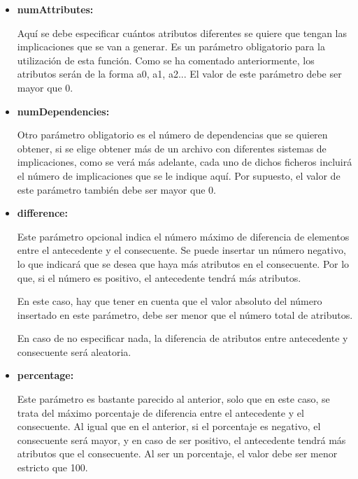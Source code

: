    \begin{itemize}
        \item \textbf{numAttributes:}

        Aqu\'i se debe especificar cu\'antos atributos diferentes se quiere que tengan las implicaciones que se van a generar. Es un 
        par\'ametro obligatorio para la utilizaci\'on de esta funci\'on. Como se ha comentado anteriormente, los atributos ser\'an de la 
        forma a0, a1, a2... El valor de este par\'ametro debe ser mayor que 0.

        \clearpage

        \item \textbf{numDependencies:}

        Otro par\'ametro obligatorio es el n\'umero de dependencias que se quieren obtener, si se elige obtener m\'as de un archivo 
        con diferentes sistemas de implicaciones, como se ver\'a m\'as adelante, cada uno de dichos ficheros incluir\'a el n\'umero 
        de implicaciones que se le indique aqu\'i. Por supuesto, el valor de este par\'ametro tambi\'en debe ser mayor que 0.

        
        \item \textbf{difference:}

        Este par\'ametro opcional indica el n\'umero m\'aximo de diferencia de elementos entre el antecedente y el consecuente. Se puede 
        insertar un n\'umero negativo, lo que indicar\'a que se desea que haya m\'as atributos en el consecuente. Por lo que, si el n\'umero 
        es positivo, el antecedente tendr\'a m\'as atributos.

        En este caso, hay que tener en cuenta que el valor absoluto del n\'umero insertado en este par\'ametro, debe ser menor 
        que el n\'umero total de atributos.

        En caso de no especificar nada, la diferencia de atributos entre antecedente y consecuente ser\'a aleatoria.


        \item \textbf{percentage:}

        Este par\'ametro es bastante parecido al anterior, solo que en este caso, se trata del m\'aximo porcentaje de diferencia entre 
        el antecedente y el consecuente. Al igual que en el anterior, si el porcentaje es negativo, el consecuente ser\'a mayor, y en caso de 
        ser positivo, el antecedente tendr\'a m\'as atributos que el consecuente. Al ser un porcentaje, el valor debe ser menor estricto que 
        100.


\end{itemize}
